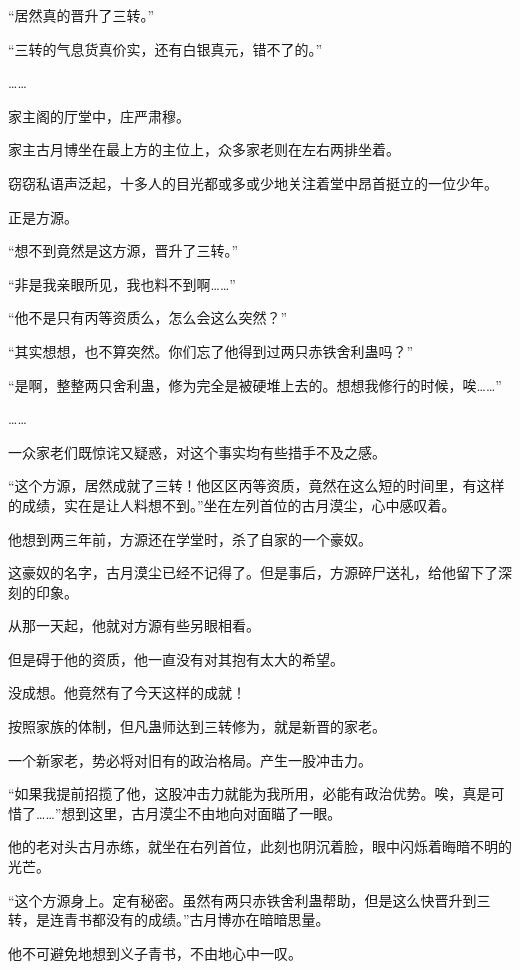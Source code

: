 
\begin{this_body}

“居然真的晋升了三转。”

“三转的气息货真价实，还有白银真元，错不了的。”

……

家主阁的厅堂中，庄严肃穆。

家主古月博坐在最上方的主位上，众多家老则在左右两排坐着。

窃窃私语声泛起，十多人的目光都或多或少地关注着堂中昂首挺立的一位少年。

正是方源。

“想不到竟然是这方源，晋升了三转。”

“非是我亲眼所见，我也料不到啊……”

“他不是只有丙等资质么，怎么会这么突然？”

“其实想想，也不算突然。你们忘了他得到过两只赤铁舍利蛊吗？”

“是啊，整整两只舍利蛊，修为完全是被硬堆上去的。想想我修行的时候，唉……”

……

一众家老们既惊诧又疑惑，对这个事实均有些措手不及之感。

“这个方源，居然成就了三转！他区区丙等资质，竟然在这么短的时间里，有这样的成绩，实在是让人料想不到。”坐在左列首位的古月漠尘，心中感叹着。

他想到两三年前，方源还在学堂时，杀了自家的一个豪奴。

这豪奴的名字，古月漠尘已经不记得了。但是事后，方源碎尸送礼，给他留下了深刻的印象。

从那一天起，他就对方源有些另眼相看。

但是碍于他的资质，他一直没有对其抱有太大的希望。

没成想。他竟然有了今天这样的成就！

按照家族的体制，但凡蛊师达到三转修为，就是新晋的家老。

一个新家老，势必将对旧有的政治格局。产生一股冲击力。

“如果我提前招揽了他，这股冲击力就能为我所用，必能有政治优势。唉，真是可惜了……”想到这里，古月漠尘不由地向对面瞄了一眼。

他的老对头古月赤练，就坐在右列首位，此刻也阴沉着脸，眼中闪烁着晦暗不明的光芒。

“这个方源身上。定有秘密。虽然有两只赤铁舍利蛊帮助，但是这么快晋升到三转，是连青书都没有的成绩。”古月博亦在暗暗思量。

他不可避免地想到义子青书，不由地心中一叹。


\end{this_body}
